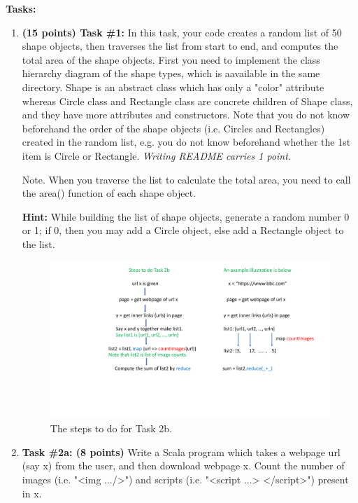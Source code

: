 \documentclass[paper=letter, fontsize=11pt]{scrartcl} %
\begin{document}
    \textbf{Tasks:}
    \begin{enumerate}
       \item \textbf{(15 points) Task \#1:} In this task, your code creates a random list of 50 shape objects, 
then traverses the list from start to end, and computes the total area of the shape objects. 
First you need to implement the class hierarchy diagram of the shape types, which is aavailable in the same directory. 
Shape is an abstract class which has only a "color" attribute whereas Circle class and Rectangle class are concrete 
children of Shape class, and they have more attributes and constructors. 
Note that you do not know beforehand the order of the shape objects (i.e. Circles and Rectangles) 
created in the random list, e.g. you do not know beforehand whether the 1st item is Circle or Rectangle.
\emph{Writing README carries 1 point.}

Note. When you traverse the list to calculate the total area, you need to call the area() function of each shape object.

\textbf{Hint:} While building the list of shape objects, generate a random number 0 or 1; if 0, then you may add a Circle object, else add a Rectangle object to the list.

\begin{figure}
  \centering
  \includegraphics[width=15cm]{task2Fig.pdf}
  \caption{The steps to do for Task 2b.}  \label{fig:2b}
\end{figure}

        \item \textbf{Task \#2a: (8 points)} Write a Scala program which takes a webpage url (say x) from the user, and then download webpage x.
Count the number of images (i.e. "<img .../>") and scripts (i.e. "<script ...> </script>") present in x.



\end{enumerate}
\end{document}

